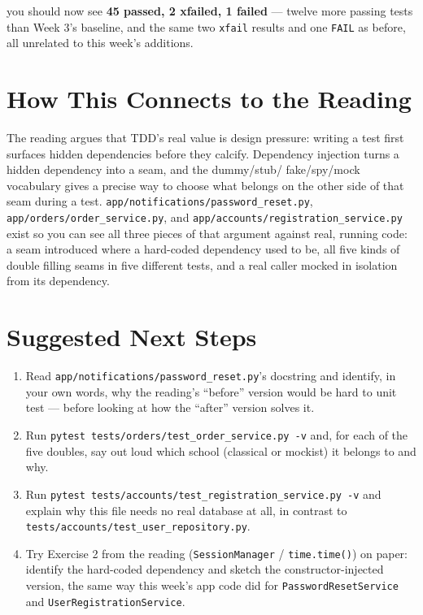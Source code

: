 \documentclass[11pt]{article}
\begin{document}
you should now see \textbf{45 passed, 2 xfailed, 1 failed} --- twelve
more passing tests than Week 3's baseline, and the same two
\texttt{xfail} results and one \texttt{FAIL} as before, all unrelated to
this week's additions.

\section{How This Connects to the Reading}
\begin{keyidea}
The reading argues that TDD's real value is design pressure: writing a
test first surfaces hidden dependencies before they calcify. Dependency
injection turns a hidden dependency into a seam, and the dummy/stub/
fake/spy/mock vocabulary gives a precise way to choose what belongs on
the other side of that seam during a test.
\texttt{app/notifications/password\_reset.py},
\texttt{app/orders/order\_service.py}, and
\texttt{app/accounts/registration\_service.py} exist so you can see all
three pieces of that argument against real, running code: a seam
introduced where a hard-coded dependency used to be, all five kinds of
double filling seams in five different tests, and a real caller mocked
in isolation from its dependency.
\end{keyidea}

\section{Suggested Next Steps}
\begin{enumerate}
\item Read \texttt{app/notifications/password\_reset.py}'s docstring and
identify, in your own words, why the reading's ``before'' version would
be hard to unit test --- before looking at how the ``after'' version
solves it.
\item Run \texttt{pytest tests/orders/test\_order\_service.py -v} and,
for each of the five doubles, say out loud which school (classical or
mockist) it belongs to and why.
\item Run \texttt{pytest tests/accounts/test\_registration\_service.py -v}
and explain why this file needs no real database at all, in contrast to
\texttt{tests/accounts/test\_user\_repository.py}.
\item Try Exercise 2 from the reading (\texttt{SessionManager} /
\texttt{time.time()}) on paper: identify the hard-coded dependency and
sketch the constructor-injected version, the same way this week's app
code did for \texttt{PasswordResetService} and
\texttt{UserRegistrationService}.
\end{enumerate}
\end{document}
